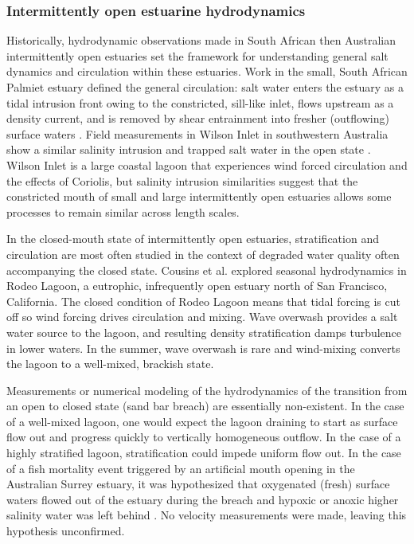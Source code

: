 \subsubsection{Intermittently open estuarine hydrodynamics}

Historically, hydrodynamic observations made in South African then Australian intermittently open estuaries set the framework for understanding general salt dynamics and circulation within these estuaries. Work in the small, South African Palmiet estuary defined the general circulation: salt water enters the estuary as a tidal intrusion front owing to the constricted, sill-like inlet, flows upstream as a density current, and is removed by shear entrainment into fresher (outflowing) surface waters \parencite{largier_stratified_1992}. Field measurements in Wilson Inlet in southwestern Australia show a similar salinity intrusion and trapped salt water in the open state \parencite{ranasinghe_circulation_1999}. Wilson Inlet is a large coastal lagoon that experiences wind forced circulation and the effects of Coriolis, but salinity intrusion similarities suggest that the constricted mouth of small and large intermittently open estuaries allows some processes to remain similar across length scales. 


In the closed-mouth state of intermittently open estuaries, stratification and circulation are most often studied in the context of degraded water quality often accompanying the closed state. Cousins et al. \parencite*{cousins_effects_2010} explored seasonal hydrodynamics in Rodeo Lagoon, a eutrophic, infrequently open estuary north of San Francisco, California. The closed condition of Rodeo Lagoon means that tidal forcing is cut off so wind forcing drives circulation and mixing. Wave overwash provides a salt water source to the lagoon, and resulting density stratification damps turbulence in lower waters. In the summer, wave overwash is rare and wind-mixing converts the lagoon to a well-mixed, brackish state.

Measurements or numerical modeling of the hydrodynamics of the transition from an open to closed state (sand bar breach) are essentially non-existent. In the case of a well-mixed lagoon, one would expect the lagoon draining to start as surface flow out and progress quickly to vertically homogeneous outflow.  In the case of a highly stratified lagoon, stratification could impede uniform flow out. In the case of a fish mortality event triggered by an artificial mouth opening in the Australian Surrey estuary, it was hypothesized that oxygenated (fresh) surface waters flowed out of the estuary during the breach and hypoxic or anoxic higher salinity water was left behind \parencite{becker_artificial_2009}. No velocity measurements were made, leaving this hypothesis unconfirmed.

